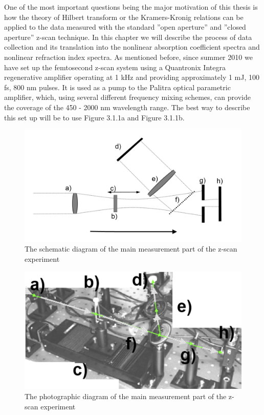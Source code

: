 \documentclass[12pt,twoside,a4paper]{article}
\numberwithin{equation}{subsection}
\numberwithin{figure}{subsection}
\begin{document}
One of the most important questions being the major motivation of this thesis is how the theory of Hilbert transform or the
Kramers-Kronig relations can be applied to the data measured with the standard ''open aperture'' and ''closed aperture'' z-scan
technique. In this chapter we will describe the process of data collection and its translation into the nonlinear absorption
coefficient spectra and nonlinear refraction index spectra. As mentioned before, since summer 2010 we have set up the femtosecond
z-scan system using a Quantronix Integra regenerative amplifier operating at 1 kHz and providing approximately 1 mJ, 100 fs, 800 nm
pulses. It is used as a pump to the Palitra optical parametric amplifier, which, using several different frequency mixing schemes,
can provide the coverage of the 450 - 2000 nm wavelength range. The best way to describe this set up will be to use Figure 3.1.1a
and Figure 3.1.1b.

\begin{figure}
 \includegraphics{img/zscan_sch.png}
 \caption{ The schematic diagram of the main measurement part of the z-scan experiment 
 \label{fig:zscan_sch}}
\end{figure}

\begin{figure}
 \includegraphics{img/zscan_diag.png}
 \caption{The photographic diagram of the main measurement part of the z-scan experiment 
 \label{fig:zscan_diag}}
\end{figure}
\end{document}
